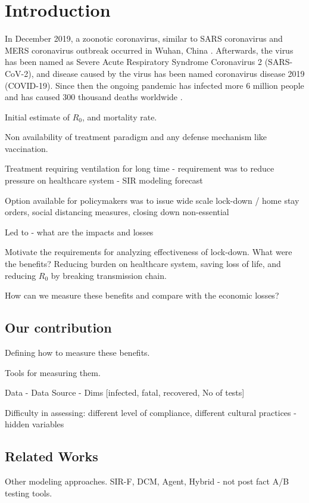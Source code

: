 \documentclass[preprint,authoryear,12pt]{elsarticle}
\begin{document}
	
	\section{Introduction}
	\label{SEC1}
	In December 2019, a zoonotic coronavirus, similar to SARS coronavirus and MERS coronavirus outbreak occurred in Wuhan, China \cite{taaa021}.  Afterwards, the virus has been named as Severe Acute Respiratory Syndrome Coronavirus 2 (SARS-CoV-2), and disease caused by the virus has been named coronavirus disease 2019 (COVID-19). Since then the ongoing pandemic has infected more 6 million people and has caused 300 thousand deaths worldwide .
	
	Initial estimate of $R_0$, and mortality rate. 
	
	Non availability of treatment paradigm and any defense mechanism like vaccination.
	 
	Treatment requiring ventilation for long time - requirement was to reduce pressure on healthcare system - SIR modeling forecast 
	
	Option available for policymakers was to issue wide scale lock-down / home stay orders, social distancing measures, closing down non-essential 
	
	Led to - what are the impacts and losses
	
	Motivate the requirements for analyzing effectiveness of lock-down.   What were the benefits? Reducing burden on healthcare system, saving loss of life, and reducing $R_0$ by breaking transmission chain. 
	
	How can we measure these benefits and compare with the economic losses?
	
	\subsection{Our contribution}
	Defining how to measure these benefits.
	
	Tools for measuring them.
	
	Data - Data Source - Dims [infected, fatal, recovered, No of tests] 
	
	Difficulty in assessing: different level of compliance, different cultural practices - hidden variables
	
	\subsection{Related Works}
	Other modeling approaches. SIR-F, DCM, Agent, Hybrid - not post fact A/B testing tools.
	
\end{document}
